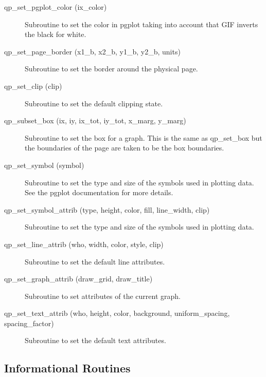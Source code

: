\begin{description}
\item[qp\_set\_pgplot\_color (ix\_color) ] \Newline 
     Subroutine to set the color in pgplot taking into account that GIF
     inverts the black for white.

\item[qp\_set\_page\_border (x1\_b, x2\_b, y1\_b, y2\_b, units)] \Newline 
     Subroutine to set the border around the physical page.

\item[qp\_set\_clip (clip)] \Newline 
     Subroutine to set the default clipping state.

\item[qp\_subset\_box (ix, iy, ix\_tot, iy\_tot, x\_marg, y\_marg)] \Newline 
     Subroutine to set the box for a graph. This is the same as
     qp\_set\_box but the boundaries of the page are taken to be the box boundaries.

\item[qp\_set\_symbol (symbol)] \Newline 
     Subroutine to set the type and size of the symbols used in plotting data.
     See the pgplot documentation for more details.

\item[qp\_set\_symbol\_attrib (type, height, color, fill, line\_width, clip)] \Newline 
     Subroutine to set the type and size of the symbols used in plotting data.

\item[qp\_set\_line\_attrib (who, width, color, style, clip)] \Newline 
     Subroutine to set the default line attributes.

\item[qp\_set\_graph\_attrib (draw\_grid, draw\_title)] \Newline 
     Subroutine to set attributes of the current graph.

\item[qp\_set\_text\_attrib (who, height, color, background, 
                                uniform\_spacing, spacing\_factor) ] \Newline 
     Subroutine to set the default text attributes.

\end{description}

\subsection{Informational Routines}

